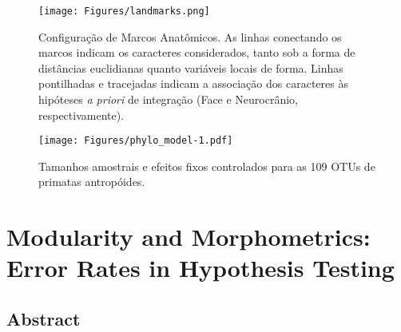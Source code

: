 \documentclass[12pt,twoside]{report}
\begin{document}


\begin{figure}[htbp]
\centering
\texttt{[image: Figures/landmarks.png]}
\caption{Configuração de Marcos Anatômicos. As linhas conectando os
marcos indicam os caracteres considerados, tanto sob a forma de
distâncias euclidianas quanto variáveis locais de forma. Linhas
pontilhadas e tracejadas indicam a associação dos caracteres às
hipóteses \emph{a priori} de integração (Face e Neurocrânio,
respectivamente). \label{fig:landmarks}}
\end{figure}



\begin{figure}[htbp]
\centering
\texttt{[image: Figures/phylo\_model-1.pdf]}
\caption{Tamanhos amostrais e efeitos fixos controlados para as 109 OTUs
de primatas antropóides. \label{fig:phylo_model}}
\end{figure}

\def\sectionautorefname{Section} \def\chapterautorefname{Chapter}
\def\figureautorefname{Figure} \def\tableautorefname{Table}


\newpage
\chapter{Modularity and Morphometrics: Error Rates in Hypothesis Testing}
\label{ch:modcomp}

\section{Abstract}\label{abstract}
\end{document}
